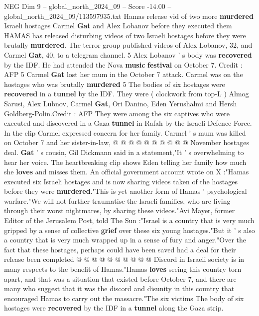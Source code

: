 \begin{textsample}{NEG Dim 9 – global\_north\_2024\_09 – Score -14.00 – global\_north\_2024\_09/113597935.txt}  \label{ex:f9_neg_002}
Hamas release vid of two more \textbf{murdered} Israeli hostages Carmel \textbf{Gat} and Alex Lobanov before they executed them HAMAS has released disturbing videos of two Israeli hostages before they were brutally \textbf{murdered}.
The terror group published videos of Alex Lobanov, 32, and Carmel \textbf{Gat}, 40, to a telegram channel. 5 Alex Lobanov ' s body was \textbf{recovered} by the IDF.
He had attended the Nova \textbf{music} \textbf{festival} on October 7.
Credit : AFP 5 Carmel \textbf{Gat} lost her mum in the October 7 attack.
Carmel was on the hostages who was brutally \textbf{murdered} 5 The bodies of six hostages were \textbf{recovered} in a \textbf{tunnel} by the IDF.
They were ( clockwork from top-L ) Almog Sarusi, Alex Lubnov, Carmel \textbf{Gat}, Ori Danino, Eden Yerushalmi and Hersh Goldberg-Polin.Credit : AFP They were among the six captives who were executed and discovered in a Gaza \textbf{tunnel} in Rafah by the Israeli Defence Force.
In the clip Carmel expressed concern for her family.
Carmel ' s mum was killed on October 7 and her sister-in-law, @ @ @ @ @ @ @ @ @ @ November hostages deal. \textbf{Gat} ' s cousin, Gil Dickmann said in a statement,"It ' s overwhelming to hear her voice.
The heartbreaking clip shows Eden telling her family how much she \textbf{loves} and misses them.
An official government account wrote on X :"Hamas executed six Israeli hostages and is now sharing videos taken of the hostages before they were \textbf{murdered}."This is yet another form of Hamas ' psychological warfare."We will not further traumatise the Israeli families, who are living through their worst nightmares, by sharing these videos."Avi Mayer, former Editor of the Jerusalem Post, told The Sun :"Israel is a country that is very much gripped by a sense of collective \textbf{grief} over these six young hostages."But it ' s also a country that is very much wrapped up in a sense of fury and anger."Over the fact that these hostages, perhaps could have been saved had a deal for their release been completed @ @ @ @ @ @ @ @ @ @ Discord in Israeli society is in many respects to the benefit of Hamas."Hamas \textbf{loves} seeing this country torn apart, and that was a situation that existed before October 7, and there are many who suggest that it was the discord and disunity in this country that encouraged Hamas to carry out the massacre."The six victims The body of six hostages were \textbf{recovered} by the IDF in a \textbf{tunnel} along the Gaza strip.

\end{textsample}
